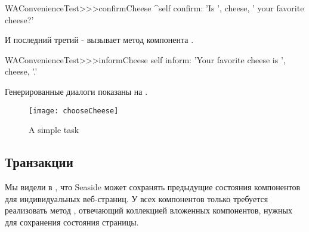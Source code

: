 \documentclass[a4paper,10pt,twoside]{book}
\begin{document}
\begin{code}{}
WAConvenienceTest>>>confirmCheese
	^self confirm: 'Is ', cheese,  ' your favorite cheese?'
\end{code}


И последний третий - вызывает метод 
компонента .

\begin{code}{}
WAConvenienceTest>>>informCheese
	self inform: 'Your favorite cheese is ', cheese, '.'
\end{code}


Генерированные диалоги показаны на .

\begin{figure}[ht]
\begin{center}
\texttt{[image: chooseCheese]}
\caption{A simple task}
\end{center}
\end{figure}


\subsection{Транзакции}


Мы видели в ,
что Seaside может сохранять предыдущие состояния компонентов для
индивидуальных веб-страниц.
У всех компонентов только требуется реализовать метод ,
отвечающий коллекцией вложенных компонентов, нужных для сохранения
состояния страницы.

\end{document}
